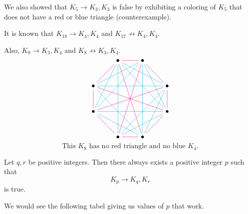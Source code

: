 \documentclass[12pt]{article}
\begin{document}
\noneg We also showed that $K_5\to K_3,K_3$ is false by exhibiting a coloring of $K_5$ that does not have a red or blue triangle (counterexample).

\eg It is known that $K_{18}\to K_4, K_4$ and $K_{17}\not \to K_4,K_4$.

\eg Also, $K_9\to K_3,K_4$ and $K_8\not \to K_3,K_4$.
\[\begin{tikzcd}[ampersand replacement=\&,cramped,row sep=26pt]
	\& \bullet \& \bullet \\
	\bullet \&\&\& \bullet \\
	\bullet \&\&\& \bullet \\
	\& \bullet \& \bullet
	\arrow[color=magenta, no head, from=1-2, to=2-1]
	\arrow[color=magenta, no head, from=1-3, to=1-2]
	\arrow[color=magenta, no head, from=2-4, to=1-3]
	\arrow[color=magenta, no head, from=3-4, to=2-4]
	\arrow[color=magenta, no head, from=4-3, to=3-4]
	\arrow[color=magenta, no head, from=4-2, to=4-3]
	\arrow[color=magenta, no head, from=3-1, to=4-2]
	\arrow[color=magenta, no head, from=2-1, to=3-1]
	\arrow[color=cyan, no head, from=2-4, to=1-2]
	\arrow[color=cyan, no head, from=3-4, to=1-2]
	\arrow[color=magenta, no head, from=4-3, to=1-2]
	\arrow[color=cyan, no head, from=4-2, to=1-2]
	\arrow[color=cyan, no head, from=3-1, to=1-2]
	\arrow[color=cyan, no head, from=2-1, to=1-3]
	\arrow[color=cyan, no head, from=3-1, to=1-3]
	\arrow[color=magenta, no head, from=4-2, to=1-3]
	\arrow[color=cyan, no head, from=4-3, to=1-3]
	\arrow[color=cyan, no head, from=3-4, to=1-3]
	\arrow[color=cyan, no head, from=2-1, to=2-4]
	\arrow[color=magenta, no head, from=3-1, to=2-4]
	\arrow[color=cyan, no head, from=4-2, to=2-4]
	\arrow[color=cyan, no head, from=4-3, to=2-4]
	\arrow[color=magenta, no head, from=2-1, to=3-4]
	\arrow[color=cyan, no head, from=3-1, to=3-4]
	\arrow[color=cyan, no head, from=4-2, to=3-4]
	\arrow[color=cyan, no head, from=3-1, to=4-3]
	\arrow[color=cyan, no head, from=2-1, to=4-3]
\end{tikzcd}
\]
\[\text{This $K_8$ has no red triangle and no blue }K_4.\]

\theorem[Ramsey] Let $q,r$ be positive integers. Then there always exists a positive integer $p$ such that \[K_p\to K_q,K_r\] is true.

We would see the following tabel giving us values of $p$ that work.
\end{document}
